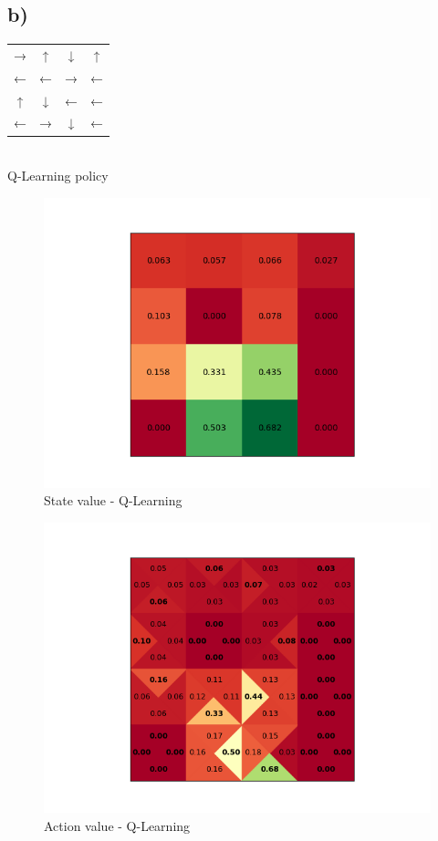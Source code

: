 \documentclass[a4paper]{article}
\begin{document}
\newpage
\subsection*{b)}
\begin{center}
	\begin{tabular}{ c c c c }
		→ & ↑ & ↓ & ↑ \\ 
		← & ← & → & ← \\
		↑ & ↓ & ← & ← \\
		← & → & ↓ & ←  
	\end{tabular} \\\vspace{10pt}
	Q-Learning policy
\end{center}

\begin{figure}[!ht]
	\centering
	\includegraphics[width=0.8\linewidth]{state_value_qlearning}
	\caption{State value -  Q-Learning }
	\label{fig:state_value_qlearning}
\end{figure}
\begin{figure}[!ht]
	\centering
	\includegraphics[width=0.8\linewidth]{action_value_qlearning}
	\caption{Action value - Q-Learning}
	\label{fig:action_value_qlearning}
\end{figure}
\end{document}
